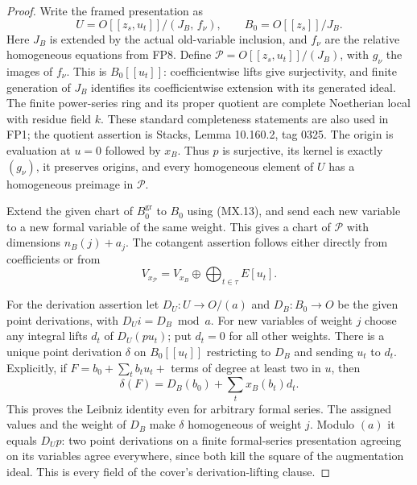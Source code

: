 \begin{proof}
Write the framed presentation as
\[
 U=O[[z_s,u_t]]/
       (J_B,\,f_\nu),\qquad
 B_0=O[[z_s]]/J_B.
 \tag{MX.17}
\]
Here $J_B$ is extended by the actual old-variable inclusion,
and $f_\nu$ are the relative homogeneous equations from FP8.
Define $\mathcal P=O[[z_s,u_t]]/(J_B)$, with $g_\nu$
the images of $f_\nu$.  This is $B_0[[u_t]]$: coefficientwise
lifts give surjectivity, and finite generation of $J_B$
identifies its coefficientwise extension with its generated
ideal.  The finite power-series ring and its proper quotient
are complete Noetherian local with residue field $k$.
These standard completeness statements are also used in
FP1; the quotient assertion is Stacks, Lemma 10.160.2,
tag 0325.  The origin is evaluation at $u=0$ followed by
$x_B$.  Thus $p$ is surjective, its kernel is exactly
$(g_\nu)$, it preserves origins, and every homogeneous
element of $U$ has a homogeneous preimage in $\mathcal P$.

Extend the given chart of $B_0^{\mathrm{gr}}$ to $B_0$
using (MX.13), and send each new variable to a new formal
variable of the same weight.  This gives a chart of
$\mathcal P$ with dimensions $n_B(j)+a_j$.
The cotangent assertion follows either directly from
coefficients or from
\[
 V_{x_{\mathcal P}}=V_{x_B}\oplus
                              \bigoplus_{t\in\tau} E[u_t].
 \tag{MX.18}
\]

For the derivation assertion let
$D_U:U\to O/(a)$ and $D_B:B_0\to O$ be the given point
derivations, with $D_Ui=D_B\bmod a$.
For new variables of weight $j$ choose any integral lifts
$d_t$ of $D_U(pu_t)$; put $d_t=0$ for all other weights.
There is a unique point derivation $\delta$ on
$B_0[[u_t]]$ restricting to $D_B$ and sending $u_t$ to
$d_t$.  Explicitly, if $F=b_0+\sum_t b_tu_t+$ terms of
degree at least two in $u$, then
\[
       \delta(F)=D_B(b_0)+\sum_t x_B(b_t)d_t.
 \tag{MX.19}
\]
This proves the Leibniz identity even for arbitrary formal
series.  The assigned values and the weight of $D_B$
make $\delta$ homogeneous of weight $j$.
Modulo $(a)$ it equals $D_Up$: two point derivations on a
finite formal-series presentation agreeing on its variables
agree everywhere, since both kill the square of the
augmentation ideal.  This is every field of the cover's
derivation-lifting clause.
\end{proof}

